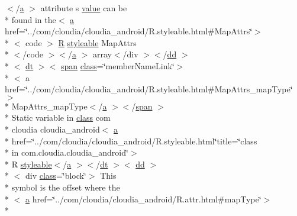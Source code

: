 \begin{DoxyCompactItemize}
$<$/\hyperlink{style_8css_a5e8981582017bb8b84c21f148345d1f7}{a} $>$ attribute s \hyperlink{_my_s_q_l_connector_8measure_8html_afcc7a4b78ecd8fa7e713f8cfa0f51017}{value} can be \\*
found in the$<$ \hyperlink{style_8css_a5e8981582017bb8b84c21f148345d1f7}{a} href=\char`\"{}../com/cloudia/cloudia\-\_\-android/R.\-styleable.\-html\#Map\-Attrs\char`\"{}$>$\\*
$<$ code $>$ \hyperlink{index-16_8html_a31e8fe59be5c20ce90a0090e28a0c1fe}{R} \hyperlink{index-17_8html_ae6c9bf1e41380184b4b665ca9ab6ba0a}{styleable} Map\-Attrs\\*
$<$/code $>$$<$/\hyperlink{style_8css_a5e8981582017bb8b84c21f148345d1f7}{a} $>$ array$<$/div $>$$<$/\hyperlink{stylesheet_8css_a47f4718a86835a7771ec592ece845221}{dd} $>$\\*
$<$ \hyperlink{stylesheet_8css_a107565fb4039d33b041380d6e0ea1d80}{dt} $>$$<$ \hyperlink{stylesheet_8css_a8343996ebcf16220b04e54659aac31cc}{span} \hyperlink{_tools_8html_acf06f836132665ba8114f5a414c2403f}{class}=\char`\"{}member\-Name\-Link\char`\"{}$>$\\*
$<$ a href=\char`\"{}../com/cloudia/cloudia\-\_\-android/R.\-styleable.\-html\#Map\-Attrs\-\_\-map\-Type\char`\"{}$>$\\*
 Map\-Attrs\-\_\-map\-Type$<$/\hyperlink{style_8css_a5e8981582017bb8b84c21f148345d1f7}{a} $>$$<$/\hyperlink{stylesheet_8css_a8343996ebcf16220b04e54659aac31cc}{span} $>$\\*
 Static variable in \hyperlink{_tools_8html_acf06f836132665ba8114f5a414c2403f}{class} com \\*
cloudia cloudia\-\_\-android$<$ \hyperlink{style_8css_a5e8981582017bb8b84c21f148345d1f7}{a} \\*
href=\char`\"{}../com/cloudia/cloudia\-\_\-android/R.\-styleable.\-html\char`\"{}title=\char`\"{}class \\*
in com.\-cloudia.\-cloudia\-\_\-android\char`\"{}$>$\\*
 R \hyperlink{index-17_8html_ae6c9bf1e41380184b4b665ca9ab6ba0a}{styleable}$<$/\hyperlink{style_8css_a5e8981582017bb8b84c21f148345d1f7}{a} $>$$<$/\hyperlink{stylesheet_8css_a107565fb4039d33b041380d6e0ea1d80}{dt} $>$$<$ \hyperlink{stylesheet_8css_a47f4718a86835a7771ec592ece845221}{dd} $>$\\*
$<$ div \hyperlink{_tools_8html_acf06f836132665ba8114f5a414c2403f}{class}=\char`\"{}block\char`\"{}$>$ This \\*
symbol is the offset where the\\*
$<$ \hyperlink{style_8css_a5e8981582017bb8b84c21f148345d1f7}{a} href=\char`\"{}../com/cloudia/cloudia\-\_\-android/R.\-attr.\-html\#map\-Type\char`\"{}$>$\\*

\end{DoxyCompactItemize}
